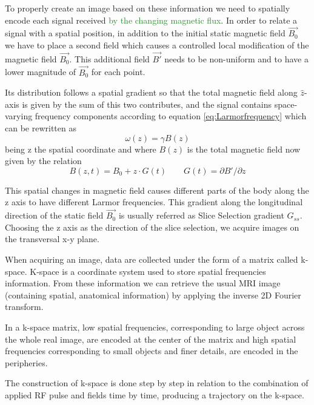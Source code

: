 \documentclass[11pt]{report}
\begin{document}
\hfill

To properly create an image based on these information we need to spatially encode each signal received \textcolor{ForestGreen}{by the changing magnetic flux}.
In order to relate a signal with a spatial position, in addition to the initial static magnetic field $\vec{B_0}$ we have to place a second field which causes a controlled local modification of the magnetic field $\vec{B_0}$. This additional field $\vec{B'}$ needs to be non-uniform and to have a lower magnitude of $\vec{B_0}$ for each point.

Its distribution follows a spatial gradient so that the total magnetic field along $\hat z$-axis is given by the sum of this two contributes, and the signal contains space-varying frequency components according to equation \textcolor{ForestGreen}{\ref{eq:Larmorfrequency}} which can be rewritten as
\begin{equation}
\omega(z) = \gamma B(z)
\end{equation}
being z the spatial coordinate and where $B(z)$ is the total magnetic field now given by the relation
\begin{equation}
B(z, t) = B_0 + z\cdot G(t) \qquad G(t) =\partial B'/\partial z
\end{equation}

This spatial changes in magnetic field causes different parts of the body along the z axis to have different Larmor frequencies.
This gradient along the longitudinal direction of the static field $\vec{B_0}$ is usually referred as Slice Selection gradient $G_{ss}$.
Choosing the z axis as the direction of the slice selection, we acquire images on the transversal x-y plane.


When acquiring an image, data are collected under the form of a matrix called k-space.
K-space is a coordinate system used to store spatial frequencies information. From these information we can retrieve the usual MRI image (containing spatial, anatomical information) by applying the inverse 2D Fourier transform.

In a k-space matrix, low spatial frequencies, corresponding to large object across the whole real image, are encoded at the center of the matrix and high spatial frequencies corresponding to small objects and finer details, are encoded in the peripheries.

The construction of k-space is done step by step in relation to the combination of applied RF pulse and fields time by time, producing a trajectory on the k-space.
\end{document}
